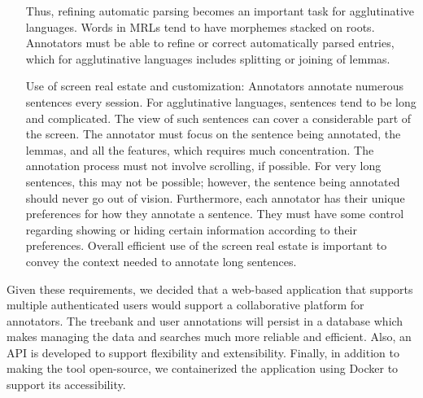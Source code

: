 \begin{itemize}[before=\normalfont, font=\itshape, align=left,noitemsep,topsep=0pt,parsep=3pt,partopsep=0pt,labelsep=3pt,align=left]
        Thus, refining automatic parsing becomes an important task for agglutinative languages.
        Words in MRLs tend to have morphemes stacked on roots.
        Annotators must be able to refine or correct automatically parsed entries, which for agglutinative languages includes splitting or joining of lemmas.
    \item[Use of screen real estate and customization:]
        Annotators annotate numerous sentences every session.
        For agglutinative languages, sentences tend to be long and complicated.
        The view of such sentences can cover a considerable part of the screen.
        The annotator must focus on the sentence being annotated, the lemmas, and all the features, which requires much concentration.
        The annotation process must not involve scrolling, if possible.
        For very long sentences, this may not be possible; however, the sentence being annotated should never go out of vision.
        Furthermore, each annotator has their unique preferences for how they annotate a sentence.
        They must have some control regarding showing or hiding certain information according to their preferences.
        Overall efficient use of the screen real estate is important to convey the context needed to annotate long sentences.
\end{itemize}

Given these requirements, we decided that a web-based application that supports multiple authenticated users would support a collaborative platform for annotators.
The treebank and user annotations will persist in a database which makes managing the data and searches much more reliable and efficient.
Also, an API is developed to support flexibility and extensibility.
Finally, in addition to making the tool open-source, we containerized the application using Docker\cite{docker} to support its accessibility.
